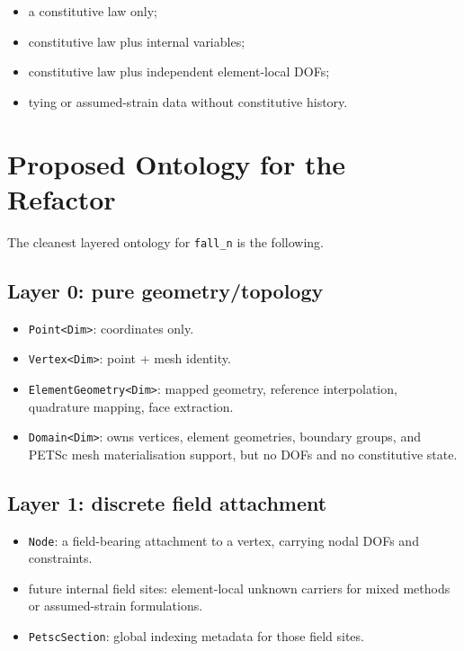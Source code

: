 \begin{itemize}[nosep]
  \item a constitutive law only;
  \item constitutive law plus internal variables;
  \item constitutive law plus independent element-local DOFs;
  \item tying or assumed-strain data without constitutive history.
\end{itemize}


\section{Proposed Ontology for the Refactor}
\label{sec:domain-ontology-proposal}

The cleanest layered ontology for \texttt{fall\_n} is the following.

\subsection{Layer 0: pure geometry/topology}

\begin{itemize}[nosep]
  \item \texttt{Point<Dim>}:
        coordinates only.
  \item \texttt{Vertex<Dim>}:
        point + mesh identity.
  \item \texttt{ElementGeometry<Dim>}:
        mapped geometry, reference interpolation, quadrature mapping, face
        extraction.
  \item \texttt{Domain<Dim>}:
        owns vertices, element geometries, boundary groups, and PETSc mesh
        materialisation support, but no DOFs and no constitutive state.
\end{itemize}

\subsection{Layer 1: discrete field attachment}

\begin{itemize}[nosep]
  \item \texttt{Node}:
        a field-bearing attachment to a vertex, carrying nodal DOFs and
        constraints.
  \item future internal field sites:
        element-local unknown carriers for mixed methods or assumed-strain
        formulations.
  \item \texttt{PetscSection}:
        global indexing metadata for those field sites.
\end{itemize}

